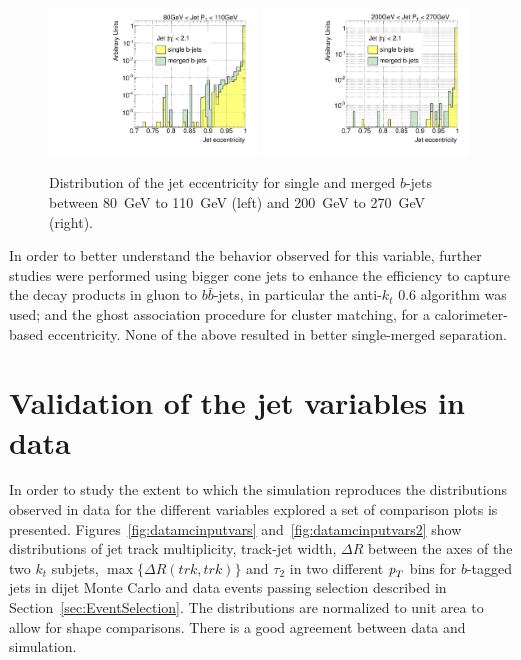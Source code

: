 \begin{figure}[tp]
\centering
\includegraphics[width=0.49\textwidth]{FIGS/VarsSingleMerged/JetEcc080.pdf}
\includegraphics[width=0.49\textwidth]{FIGS/VarsSingleMerged/JetEcc200.pdf}
\caption{Distribution of the jet eccentricity for single and merged $b$-jets between 80~GeV to 110~GeV (left) and 200~GeV to 270~GeV (right).}
\label{fig:jeteccsinglemerged}
\end{figure}


In order to better understand the behavior observed for this variable, further studies were performed using bigger cone jets to enhance the efficiency to capture the decay products in gluon to $b \bar{b}$-jets, in particular the anti-$k_t$ 0.6 algorithm was used; and the ghost association procedure for cluster matching, for a calorimeter-based eccentricity. None of the above resulted in better single-merged separation.






\section{Validation of the jet variables in data}\label{sec:gbbValidation}

 In order to study the extent to which the simulation reproduces the distributions observed in data for the different variables explored a set of comparison plots is presented. Figures~\ref{fig:datamcinputvars} and~\ref{fig:datamcinputvars2} show distributions of jet track multiplicity, track-jet width, $\Delta R$ between the axes of the two $k_t$ subjets, $\max\{\Delta R(trk,trk)\}$ and $\tau_2$ in two different ${\emph{p}_{T}}$ bins for $b$-tagged jets in dijet Monte Carlo and data events passing selection described in Section~\ref{sec:EventSelection}.
The distributions are normalized to unit area to allow for shape comparisons. There is a good agreement between data and simulation. 


